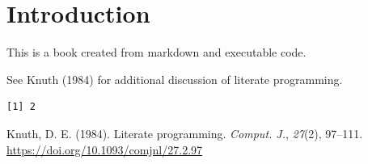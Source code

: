 \documentclass[
  11pt,
  letterpaper,
  DIV=11,
  numbers=noendperiod]{scrreprt}
\author{}
\date{}
\newlength{\cslhangindent}
\newenvironment{CSLReferences}[2] %
 {\begin{list}{}{%
  \setlength{\itemindent}{0pt}
  \setlength{\leftmargin}{0pt}
  \setlength{\parsep}{0pt}
  \ifodd #1
   \setlength{\leftmargin}{\cslhangindent}
   \setlength{\itemindent}{-1\cslhangindent}
  \fi
  \setlength{\itemsep}{#2\baselineskip}}}
 {\end{list}}
\renewcommand*\contentsname{Table of contents}
\newcommand\contentsname{Table of contents}
\begin{document}
\renewcommand*\contentsname{Table of contents}
{
\setcounter{tocdepth}{2}
\tableofcontents
}

\chapter{Introduction}\label{introduction}

This is a book created from markdown and executable code.

See Knuth (1984) for additional discussion of literate programming.

\begin{verbatim}
[1] 2
\end{verbatim}

\protect{}\label{refs}
\begin{CSLReferences}{1}{0}
Knuth, D. E. (1984). Literate programming. \emph{Comput. J.},
\emph{27}(2), 97--111. \url{https://doi.org/10.1093/comjnl/27.2.97}

\end{CSLReferences}
\end{document}

